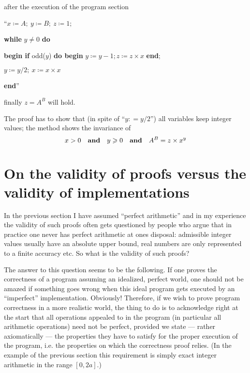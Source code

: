 \begin{enumerate}[leftmargin=*, itemindent=3\parindent, label=\textit{Remark }\arabic*.]
	after the execution of the program section
	
	{
		\setlength{\parindent}{8em}
		\hspace{-.5em}``$x \coloneq A;\ y \coloneq B;\ z \coloneq 1;$
		
		\textbf{while} $y \neq 0$ \textbf{do}
		
		\quad\textbf{begin if} odd($y$) \textbf{do begin} $y \coloneq y - 1; z \coloneq z \times x$ \textbf{end};
		
		\quad\quad $y \coloneq y/2;\ x \coloneq x \times x$
		
		\quad\textbf{end}''
	}
	
	finally $z = A^B$ will hold.
\end{enumerate}


The proof has to show that (in spite of ``$y: = y/2$'') all variables keep integer values; the method shows the invariance of
$$
x > 0\quad \text{\textbf{and}}\quad y \geqslant 0\quad \text{\textbf{and}}\quad A^B = z \times x^y
$$

\section{On the validity of proofs versus the validity of implementations}

In the previous section I have assumed ``perfect arithmetic'' and in my experience the validity of such proofs often gets questioned by people who argue that in practice one never has perfect arithmetic at ones disposal: admissible integer values usually have an absolute upper bound, real numbers are only represented to a finite accuracy etc. So what is the validity of such proofs?

The answer to this question seems to be the following. If one proves the correctness of a program assuming an idealized, perfect world, one should not be amazed if something goes wrong when this ideal program gets executed by an ``imperfect'' implementation. Obviously! Therefore, if we wish to prove program correctness in a more realistic world, the thing to do is to acknowledge right at the start that all operations appealed to in the program (in particular all arithmetic operations) need not be perfect, provided we state --- rather axiomatically --- the properties they have to satisfy for the proper execution of the program, i.e. the properties on which the correctness proof relies. (In the example of the previous section this requirement is simply exact integer arithmetic in the range $[0, 2a]$.)


